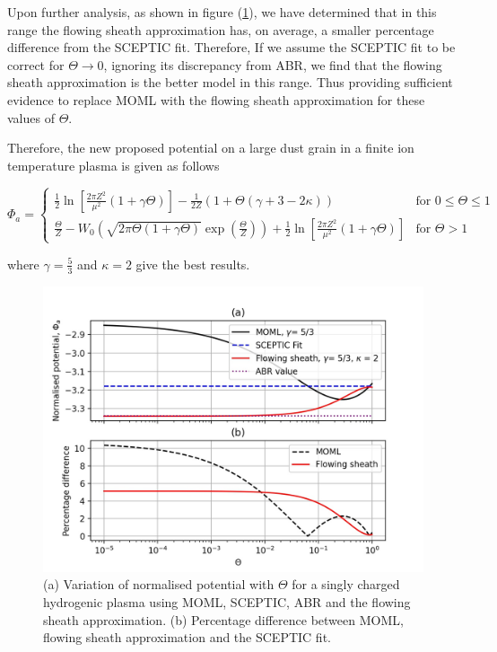 \documentclass{article}
\begin{document}
\medskip

Upon further analysis, as shown in figure (\ref{MOMLvsFS}), we have determined 
that in this range the flowing sheath approximation has, on average, 
a smaller percentage difference from the SCEPTIC fit. Therefore, If we assume
the SCEPTIC fit to be correct for $\Theta \to 0$, ignoring its discrepancy from ABR, we find that the
flowing sheath approximation is the better model in this range. Thus providing sufficient evidence to replace MOML with 
the flowing sheath approximation for these values of $\Theta$.

\medskip

Therefore, the new proposed potential on a large dust grain in a finite ion temperature plasma is given as follows

\begin{equation}
\Phi_a = 
\begin{cases}
\frac{1}{2}\ln{\left[\frac{2\pi Z^2}{\mu^2}(1 + \gamma \Theta)\right]} - \frac{1}{2Z}\left(1 + \Theta\left(\gamma + 3 -2\kappa\right)\right) & \text{for }0 \leq \Theta \leq 1\\
\frac{\Theta}{Z} - W_{0}\left(\sqrt{2\pi \Theta (1 + \gamma \Theta)} \exp{\left (\frac{\Theta}{Z}\right)}\right) + \frac{1}{2}\ln{\left[\frac{2\pi Z^2}{\mu^2}(1 + \gamma \Theta)\right]} & \text{for } \Theta > 1
\end{cases}
\end{equation}

\noindent where $\gamma = \frac{5}{3}$ and $\kappa = 2$ give the best results.

\begin{figure}[H]
\centering
\includegraphics[width=\linewidth]{Output/MOMLvsFS.jpeg}
\caption{(a) Variation of normalised potential with $\Theta$ for a singly charged hydrogenic plasma using MOML, SCEPTIC,
ABR and the flowing sheath approximation. (b) Percentage difference between MOML, flowing 
sheath approximation and the SCEPTIC fit.}
\label{MOMLvsFS} 
\end{figure}
\end{document}
